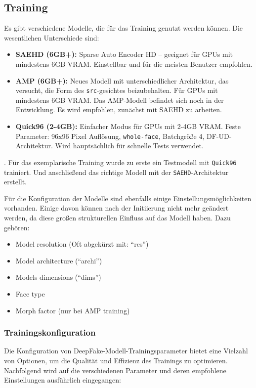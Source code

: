\subsection{Training}\label{subsec:training}
Es gibt verschiedene Modelle, die für das Training genutzt werden können.
Die wesentlichen Unterschiede sind:
\begin{itemize}
    \item \textbf{SAEHD (6GB+):} Sparse Auto Encoder HD – geeignet für GPUs mit mindestens 6GB VRAM.
    Einstellbar und für die meisten Benutzer empfohlen.
    \item \textbf{AMP (6GB+):} Neues Modell mit unterschiedlicher Architektur, das versucht, die Form des \texttt{src}-gesichtes beizubehalten.
    Für GPUs mit mindestens 6GB VRAM.
Das AMP-Modell befindet sich noch in der Entwicklung.
    Es wird empfohlen, zunächst mit SAEHD zu arbeiten.
    \item \textbf{Quick96 (2-4GB):} Einfacher Modus für GPUs mit 2-4GB VRAM.
    Feste Parameter: 96x96 Pixel Auflösung, \texttt{whole-face}, Batchgröße 4, DF-UD-Architektur.
    Wird hauptsächlich für schnelle Tests verwendet.
\end{itemize}.
Für das exemplarische Training wurde zu erste ein Testmodell mit \texttt{Quick96} trainiert.
Und anschließend das richtige Modell mit der \texttt{SAEHD}-Architektur erstellt.

Für die Konfiguration der Modelle sind ebenfalls einige Einstellungsmöglichkeiten vorhanden.
Einige davon können nach der Initiierung nicht mehr geändert werden, da diese großen strukturellen Einfluss auf das Modell haben.
Dazu gehören:
\begin{itemize}
    \item Model resolution (Oft abgekürzt mit: ``res'')
    \item Model architecture (``archi'')
    \item Models dimensions (``dims'')
    \item Face type
    \item Morph factor (nur bei AMP training)
\end{itemize}

\subsubsection*{Trainingskonfiguration}
Die Konfiguration von DeepFake-Modell-Trainingsparameter bietet eine Vielzahl von Optionen, um die Qualität und Effizienz des Trainings zu optimieren.
Nachfolgend wird auf die verschiedenen Parameter und deren empfohlene Einstellungen ausführlich eingegangen:

